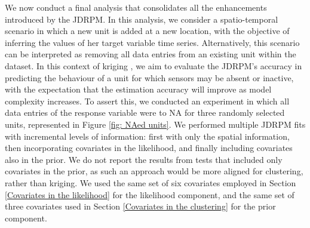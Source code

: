 \documentclass[12pt,	%
	a4paper,		%
	twoside,		%
	openright,		%
	titlepage,%
	]{book}
\theoremstyle{definition}
\let\cite\citep
\begin{document}
We now conduct a final analysis that consolidates all the enhancements introduced by the JDRPM. In this analysis, we consider a spatio-temporal scenario in which a new unit is added at a new location, with the objective of inferring the values of her target variable time series. Alternatively, this scenario can be interpreted as removing all data entries from an existing unit within the dataset. In this context of kriging \cite{krige1951statistical}, we aim to evaluate the JDRPM's accuracy in predicting the behaviour of a unit for which sensors may be absent or inactive, with the expectation that the estimation accuracy will improve as model complexity increases. To assert this, we conducted an experiment in which all data entries of the response variable were to NA for three randomly selected units, represented in Figure \ref{fig: NAed units}. We performed multiple JDRPM fits with incremental levels of information: first with only the spatial information, then incorporating covariates in the likelihood, and finally including covariates also in the prior. We do not report the results from tests that included only covariates in the prior, as such an approach would be more aligned for clustering, rather than kriging. We used the same set of six covariates employed in Section \ref{Covariates in the likelihood} for the likelihood component, and the same set of three covariates used in Section \ref{Covariates in the clustering} for the prior component.
\end{document}
